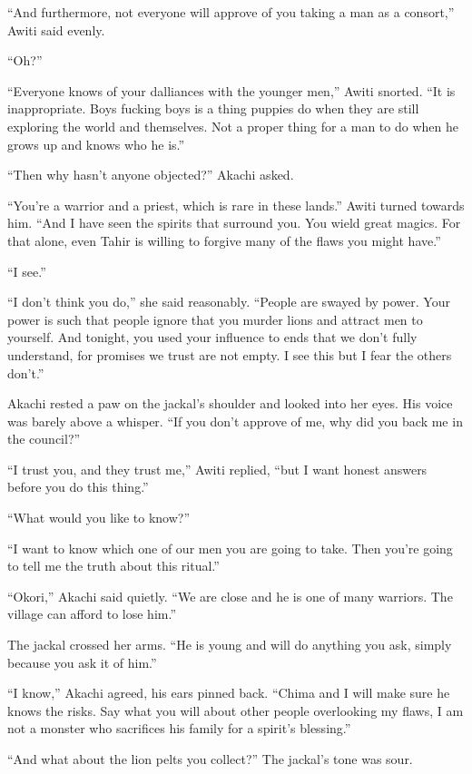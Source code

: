 ``And furthermore, not everyone will approve of you taking a man as a consort,'' Awiti said evenly.

``Oh?''

``Everyone knows of your dalliances with the younger men,'' \mbox{Awiti} snorted. ``It is inappropriate. Boys fucking boys is a thing puppies do when they are still exploring the world and themselves. Not a proper thing for a man to do when he grows up and knows who he is.''

``Then why hasn't anyone objected?'' Akachi asked.

``You're a warrior and a priest, which is rare in these lands.'' Awiti turned towards him. ``And I have seen the spirits that surround you. You wield great magics. For that alone, even Tahir is willing to forgive many of the flaws you might have.''

``I see.''

``I don't think you do,'' she said reasonably. ``People are swayed by power. Your power is such that people ignore that you murder lions and attract men to yourself. And tonight, you used your influence to ends that we don't fully understand, for promises we trust are not empty. I see this but I fear the others don't.''

Akachi rested a paw on the jackal's shoulder and looked into her eyes. His voice was barely above a whisper. ``If you don't approve of me, why did you back me in the council?''

``I trust you, and they trust me,'' Awiti replied, ``but I want honest answers before you do this thing.''

``What would you like to know?''

``I want to know which one of our men you are going to take. Then you're going to tell me the truth about this ritual.''

``Okori,'' Akachi said quietly. ``We are close and he is one of many warriors. The village can afford to lose him.''

The jackal crossed her arms. ``He is young and will do anything you ask, simply because you ask it of him.''

``I know,'' Akachi agreed, his ears pinned back. ``Chima and I will make sure he knows the risks. Say what you will about other people overlooking my flaws, I am not a monster who sacrifices his family for a spirit's blessing.''

``And what about the lion pelts you collect?'' The jackal's tone was sour.

